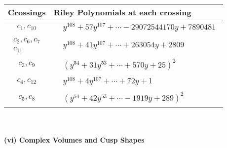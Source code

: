\documentclass[1p]{elsarticle_modified}
\theoremstyle{definition}
\begin{document}
\begin{tabular}{m{50pt}|m{274pt}}
Crossings & \hspace{64pt}Riley Polynomials at each crossing \\
\hline $$\begin{aligned}c_{1},c_{10}\end{aligned}$$&$\begin{aligned}
&y^{108}+57 y^{107}+\cdots-29072544170 y+7890481
\end{aligned}$\\
\hline $$\begin{aligned}c_{2},c_{6},c_{7}\\c_{11}\end{aligned}$$&$\begin{aligned}
&y^{108}+41 y^{107}+\cdots+263054 y+2809
\end{aligned}$\\
\hline $$\begin{aligned}c_{3},c_{9}\end{aligned}$$&$\begin{aligned}
&(y^{54}+31 y^{53}+\cdots+570 y+25)^{2}
\end{aligned}$\\
\hline $$\begin{aligned}c_{4},c_{12}\end{aligned}$$&$\begin{aligned}
&y^{108}+4 y^{107}+\cdots+72 y+1
\end{aligned}$\\
\hline $$\begin{aligned}c_{5},c_{8}\end{aligned}$$&$\begin{aligned}
&(y^{54}+42 y^{53}+\cdots-1919 y+289)^{2}
\end{aligned}$\\
\hline
\end{tabular}\\~\\
\newpage\flushleft \textbf{(vi) Complex Volumes and Cusp Shapes}
\end{document}
